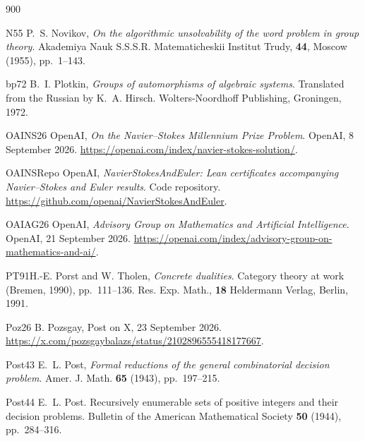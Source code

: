 \begin{thebibliography}{900}

\bibitem%
{N55}
P.~S. Novikov, \emph{On the algorithmic unsolvability of the word problem in group theory}. Akademiya Nauk S.S.S.R. Matematicheskii Institut Trudy, \textbf{44}, Moscow (1955), pp.~1--143.

%

\bibitem%
{bp72} B.~I. Plotkin, \emph{Groups of automorphisms of algebraic systems}. Translated from the Russian by K.~A. Hirsch. Wolters-Noordhoff Publishing, Groningen, 1972.

\bibitem%
{OAINS26} OpenAI, \emph{On the Navier--Stokes Millennium Prize Problem}. OpenAI, 8 September 2026. \url{https://openai.com/index/navier-stokes-solution/}.

\bibitem%
{OAINSRepo} OpenAI, \emph{NavierStokesAndEuler: Lean certificates accompanying Navier--Stokes and Euler results}. Code repository. \url{https://github.com/openai/NavierStokesAndEuler}.

\bibitem%
{OAIAG26} OpenAI, \emph{Advisory Group on Mathematics and Artificial Intelligence}. OpenAI, 21 September 2026. \url{https://openai.com/index/advisory-group-on-mathematics-and-ai/}.

\bibitem%
{PT91}H.-E. Porst and W. Tholen, \emph{Concrete dualities}. Category theory at work (Bremen, 1990), pp.~111--136. Res. Exp. Math., \textbf{18} Heldermann Verlag, Berlin, 1991.


\bibitem%
{Poz26} B. Pozsgay, Post on X, 23 September 2026. \url{https://x.com/pozsgaybalazs/status/2102896555418177667}.

\bibitem%
{Post43} E.~L. Post, \emph{Formal reductions of the general combinatorial decision problem}. Amer. J. Math.  \textbf{65} (1943), pp.~197--215.

\bibitem%
{Post44} E.~L. Post. Recursively enumerable sets of positive integers and their decision problems. Bulletin of the American Mathematical Society \textbf{50} (1944), pp.~284--316.


\end{thebibliography}
